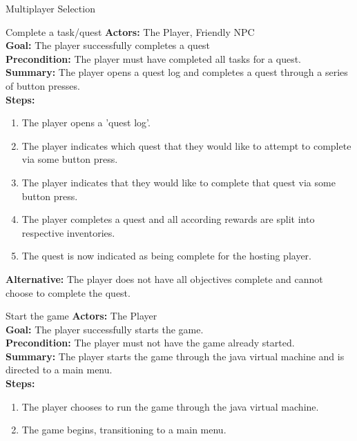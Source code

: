 \documentclass[12pt]{report}
\begin{document}
\begin{subsection}{Multiplayer Selection}
\begin{subsection}{Complete a task/quest}
\textbf{Actors:} The Player, Friendly NPC \\
\textbf{Goal:} The player successfully completes a quest \\
\textbf{Precondition:} The player must have completed all tasks for a quest. \\
\textbf{Summary:} The player opens a quest log and completes a quest through a series of button presses. \\
\textbf{Steps:}
\begin{enumerate}
	\item The player opens a 'quest log'.
	\item The player indicates which quest that they would like to attempt to complete via some button press.
	\item The player indicates that they would like to complete that quest via some button press.
	\item The player completes a quest and all according rewards are split into  respective inventories.
	\item The quest is now indicated as being complete for the hosting player.
\end{enumerate}
\textbf{Alternative:} The player does not have all objectives complete and cannot choose to complete the quest.
\end{subsection}

\begin{subsection}{Start the game}
\textbf{Actors:} The Player \\
\textbf{Goal:} The player successfully starts the game. \\
\textbf{Precondition:} The player must not have the game already started. \\
\textbf{Summary:} The player starts the game through the java virtual machine and is directed to a main menu. \\
\textbf{Steps:}
\begin{enumerate}
	\item The player chooses to run the game through the java virtual machine.
	\item The game begins, transitioning to a main menu.
\end{enumerate}
\end{subsection}


\end{subsection}
\end{document}
